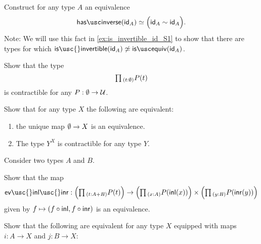 \begin{exercises}
\item \label{ex:idfunc_autohtpy}Construct for any type $A$ an equivalence
\begin{equation*}
\eqv{\hasinverse(\idfunc[A])}{\Big(\idfunc[A]\htpy\idfunc[A]\Big)}.
\end{equation*}
Note: We will use this fact in \cref{ex:is_invertible_id_S1} to show that there
are types for which $\mathsf{is\usc{}invertible}(\idfunc[A])\not\eqvsym\isequiv(\idfunc[A])$.
\item 
\begin{subexenum}
\item Show that the type
\begin{equation*}
\prd{t:\emptyt}P(t)
\end{equation*}
is contractible for any $P:\emptyset\to \mathcal{U}$.
\item Show that for any type $X$ the following are equivalent:
  \begin{enumerate}
  \item the unique map $\emptyset \to X$ is an equivalence.
  \item The type $Y^X$ is contractible for any type $Y$.
  \end{enumerate}
\end{subexenum}
\item Consider two types $A$ and $B$.
\begin{subexenum}
\item Show that the map
\begin{equation*}
  \mathsf{ev\usc{}inl\usc{}inr}: \Big(\prd{t:A+B}P(t)\Big) \to
  \Big(\prd{x:A}P(\inl(x))\Big)\times\Big(\prd{y:B}P(\inr(y))\Big)
\end{equation*}
given by $f\mapsto (f\circ{\mathsf{inl}},f\circ{\mathsf{inr}})$ is an equivalence.
\item Show that the following are equivalent for any type $X$ equipped with maps $i:A\to X$ and $j:B\to X$:

\end{subexenum}
\end{exercises}
